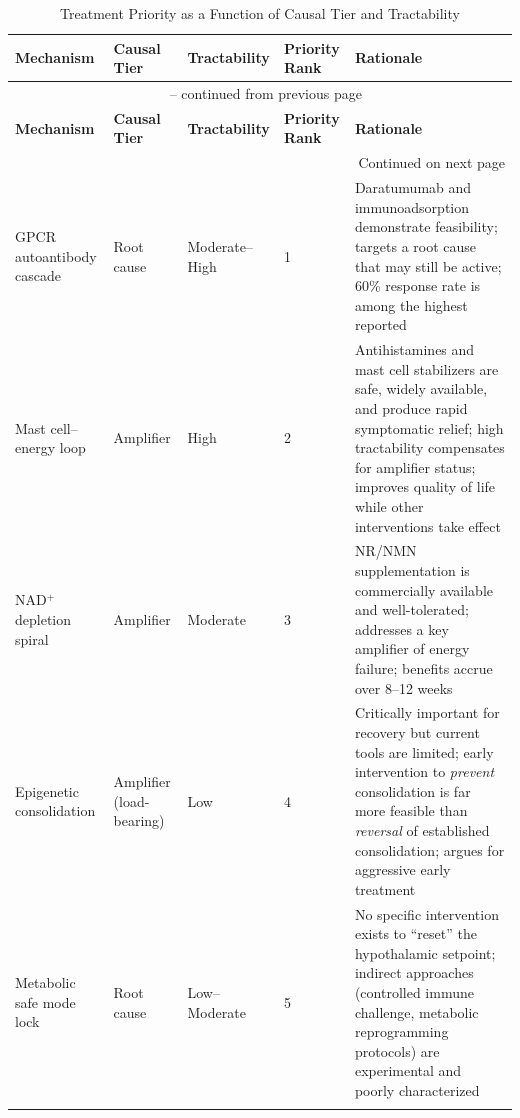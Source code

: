 \begin{landscape}
\begin{longtable}{p{3.5cm}p{2.5cm}p{2.5cm}p{2.5cm}p{5.5cm}}
\caption{Treatment Priority as a Function of Causal Tier and Tractability} \label{tab:treatment-priority} \\
\toprule
\textbf{Mechanism} & \textbf{Causal Tier} & \textbf{Tractability} & \textbf{Priority Rank} & \textbf{Rationale} \\
\midrule
\endfirsthead
\multicolumn{5}{c}{\tablename\ \thetable{} -- continued from previous page} \\
\toprule
\textbf{Mechanism} & \textbf{Causal Tier} & \textbf{Tractability} & \textbf{Priority Rank} & \textbf{Rationale} \\
\midrule
\endhead
\midrule \multicolumn{5}{r}{Continued on next page} \\
\endfoot
\bottomrule
\endlastfoot

GPCR autoantibody cascade & Root cause & Moderate--High & 1 & Daratumumab and immunoadsorption demonstrate feasibility; targets a root cause that may still be active; 60\% response rate is among the highest reported \\
\addlinespace

Mast cell--energy loop & Amplifier & High & 2 & Antihistamines and mast cell stabilizers are safe, widely available, and produce rapid symptomatic relief; high tractability compensates for amplifier status; improves quality of life while other interventions take effect \\
\addlinespace

NAD$^+$ depletion spiral & Amplifier & Moderate & 3 & NR/NMN supplementation is commercially available and well-tolerated; addresses a key amplifier of energy failure; benefits accrue over 8--12 weeks \\
\addlinespace

Epigenetic consolidation & Amplifier (load-bearing) & Low & 4 & Critically important for recovery but current tools are limited; early intervention to \emph{prevent} consolidation is far more feasible than \emph{reversal} of established consolidation; argues for aggressive early treatment \\
\addlinespace

Metabolic safe mode lock & Root cause & Low--Moderate & 5 & No specific intervention exists to ``reset'' the hypothalamic setpoint; indirect approaches (controlled immune challenge, metabolic reprogramming protocols) are experimental and poorly characterized \\
\addlinespace


\end{longtable}
\end{landscape}
